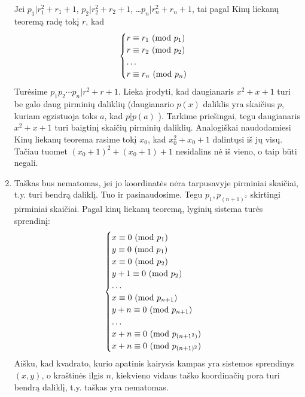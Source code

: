 \begin{enumerate}
    Jei $p_1|r_1^2 +r_1 +1$, $p_2|r_2^2 + r_2 +1$,
    \dots $p_n|r_n^2 + r_n +1$, tai pagal Kinų liekanų teoremą radę
    tokį $r$, kad 
    $$\begin{cases}
    r \equiv r_1 \ (\text{mod } p_1)\\
    r \equiv r_2 \ (\text{mod } p_2)\\
    \hdots \\
    r \equiv r_n \ (\text{mod } p_n)
    \end{cases}$$
    Turėsime $p_1p_2\cdots p_n|r^2 + r +1$. Lieka įrodyti, kad
    daugianaris $x^2 + x + 1$ turi be galo daug pirminių daliklių
    (daugianario $p(x)$ daliklis yra skaičius $p$, kuriam egzistuoja
    toks $a$, kad $p|p(a)$ ). Tarkime priešingai, tegu daugianaris
    $x^2 + x + 1$ turi baigtinį skaičių pirminių daliklių. Analogiškai
    naudodamiesi Kinų liekanų teorema rasime tokį $x_0$, kad $x_0^2 +
    x_0 + 1$ dalintųsi iš jų visų. Tačiau tuomet $(x_0+1)^2 + (x_0 + 1)
    + 1$ nesidalins nė iš vieno, o taip būti negali.
\item
    Taškas bus nematomas, jei jo koordinatės nėra tarpusavyje pirminiai
    skaičiai, t.y. turi bendrą daliklį. Tuo ir pasinaudosime. Tegu
    $p_1, p_{(n+1)^2}$ skirtingi pirminiai skaičiai. Pagal kinų liekanų
    teoremą, lyginių sistema turės sprendinį:
    $$\begin{cases}
    x \equiv 0 \ (\text{mod } p_1)\\
    y \equiv 0 \ (\text{mod } p_1)\\
    x \equiv 0 \ (\text{mod } p_2)\\
    y + 1\equiv 0\ (\text{mod } p_2)\\
    \hdots\\
    x \equiv 0 \ (\text{mod } p_{n+1})\\
    y + n \equiv 0 \ (\text{mod } p_{n+1})\\
    \hdots \\
    x + n \equiv 0 \ (\text{mod } p_{(n+1^2)})\\
    x + n \equiv 0 \ (\text{mod } p_{(n+1)^2})\\
    \end{cases}$$
    Aišku, kad kvadrato, kurio apatinis kairysis kampas yra sistemos
    sprendinys $(x,y)$, o kraštinės ilgis $n$, kiekvieno vidaus taško
    koordinačių pora turi bendrą daliklį, t.y. taškas yra nematomas.
\end{enumerate} 
